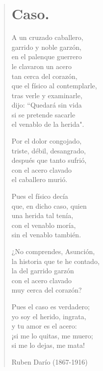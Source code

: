 \documentclass[12pt, twoside]{book}
\begin{document}
\begin{verse}
\begin{center}
\section{Caso.}
\end{center}
A un cruzado caballero,\\
garrido y noble garzón,\\
en el palenque guerrero\\
le clavaron un acero\\
tan cerca del corazón,\\
que el físico al contemplarle,\\
tras verle y examinarle,\\
dijo: ``Quedará sin vida\\
si se pretende sacarle\\
el venablo de la herida".\newline

Por el dolor congojado,\\
triste, débil, desangrado,\\
después que tanto sufrió,\\
con el acero clavado\\
el caballero murió. \newline

Pues el físico decía\\
que, en dicho caso, quien\\
una herida tal tenía,\\
con el venablo moría,\\
sin el venablo también.\newline

¿No comprendes, Asunción,\\
la historia que te he contado,\\
la del garrido garzón\\
con el acero clavado\\
muy cerca del corazón?\newpage

Pues el caso es verdadero;\\
yo soy el herido, ingrata,\\
y tu amor es el acero:\\
¡si me lo quitas, me muero;\\
si me lo dejas, me mata!\newline

Ruben Darío (1867-1916)

\end{verse}
\newpage
\end{document}
